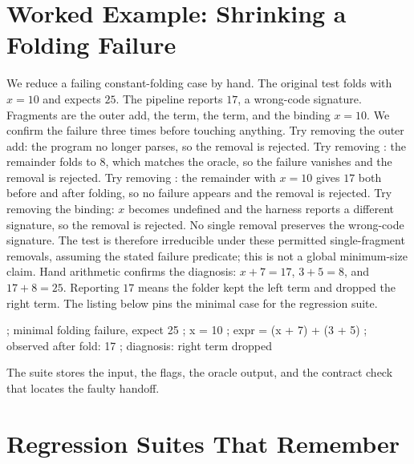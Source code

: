 \section{Worked Example: Shrinking a Folding Failure}\label{sec:ch37-worked}

We reduce a failing constant-folding case by hand.
The original test folds  with $x = 10$ and expects $25$.
The pipeline reports $17$, a wrong-code signature.
Fragments are the outer add, the  term, the  term, and the binding $x = 10$.
We confirm the failure three times before touching anything.
Try removing the outer add: the program no longer parses, so the removal is rejected.
Try removing : the remainder  folds to $8$, which matches the oracle, so the failure vanishes and the removal is rejected.
Try removing : the remainder  with $x = 10$ gives $17$ both before and after folding, so no failure appears and the removal is rejected.
Try removing the binding: $x$ becomes undefined and the harness reports a different signature, so the removal is rejected.
No single removal preserves the wrong-code signature.
The test is therefore irreducible under these permitted single-fragment removals, assuming the stated failure predicate; this is not a global minimum-size claim.
Hand arithmetic confirms the diagnosis: $x + 7 = 17$, $3 + 5 = 8$, and $17 + 8 = 25$.
Reporting $17$ means the folder kept the left term and dropped the right term.
The listing below pins the minimal case for the regression suite.
\begin{irlisting}
; minimal folding failure, expect 25
; x = 10
; expr = (x + 7) + (3 + 5)
; observed after fold: 17
; diagnosis: right term dropped
\end{irlisting}
The suite stores the input, the flags, the oracle output, and the contract check that locates the faulty handoff.

\section{Regression Suites That Remember}\label{sec:ch37-regression}

